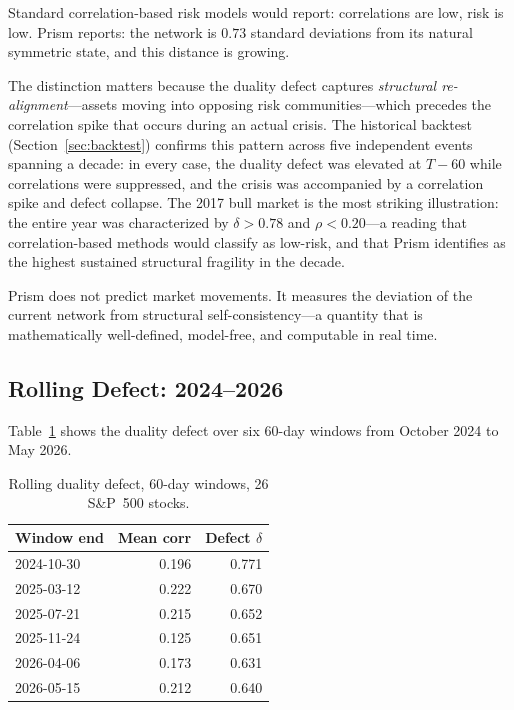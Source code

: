 \documentclass[11pt]{article}
\begin{document}
Standard correlation-based risk models would report: correlations are
low, risk is low.
Prism reports: the network is $0.73$ standard deviations from its
natural symmetric state, and this distance is growing.

The distinction matters because the duality defect captures
\emph{structural re-alignment}---assets moving into opposing risk
communities---which precedes the correlation spike that occurs during
an actual crisis.
The historical backtest (Section~\ref{sec:backtest}) confirms this
pattern across five independent events spanning a decade: in every
case, the duality defect was elevated at $T{-}60$ while correlations
were suppressed, and the crisis was accompanied by a correlation spike
and defect collapse.
The 2017 bull market is the most striking illustration: the entire year
was characterized by $\delta > 0.78$ and $\rho < 0.20$---a reading
that correlation-based methods would classify as low-risk, and that
Prism identifies as the highest sustained structural fragility in the
decade.

Prism does not predict market movements.
It measures the deviation of the current network from structural
self-consistency---a quantity that is mathematically well-defined,
model-free, and computable in real time.

\subsection{Rolling Defect: 2024--2026}

Table~\ref{tab:rolling} shows the duality defect over six 60-day
windows from October 2024 to May 2026.

\begin{table}[h]
\centering
\caption{Rolling duality defect, 60-day windows, 26 S\&P~500 stocks.}
\label{tab:rolling}
\begin{tabular}{lrr}
\toprule
Window end & Mean corr & Defect $\delta$ \\
\midrule
2024-10-30 & 0.196 & 0.771 \\
2025-03-12 & 0.222 & 0.670 \\
2025-07-21 & 0.215 & 0.652 \\
2025-11-24 & 0.125 & 0.651 \\
2026-04-06 & 0.173 & 0.631 \\
2026-05-15 & 0.212 & 0.640 \\
\bottomrule
\end{tabular}
\end{table}
\end{document}

